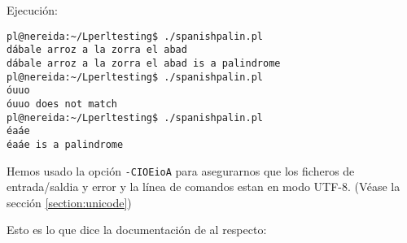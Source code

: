 Ejecución:

\begin{latexonly}
\begin{verbatim}
pl@nereida:~/Lperltesting$ ./spanishpalin.pl
dábale arroz a la zorra el abad
dábale arroz a la zorra el abad is a palindrome
pl@nereida:~/Lperltesting$ ./spanishpalin.pl
óuuo
óuuo does not match
pl@nereida:~/Lperltesting$ ./spanishpalin.pl
éaáe
éaáe is a palindrome
\end{verbatim}
\end{latexonly}


Hemos usado la opción \verb|-CIOEioA| para asegurarnos
que los ficheros de entrada/saldia y error y la línea de
comandos estan en modo UTF-8.
(Véase la sección \ref{section:unicode})

Esto es lo que dice la documentación de 
al respecto:

